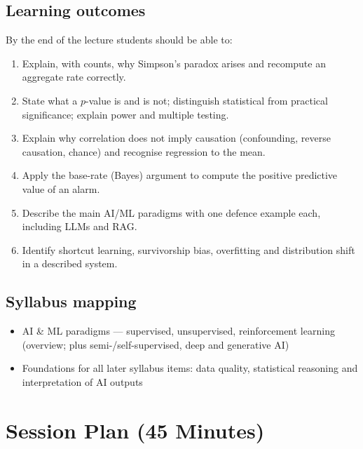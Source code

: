 \documentclass[11pt]{article}
\begin{document}
\subsection*{Learning outcomes}By the end of the lecture students should be able to:\begin{enumerate}\item Explain, with counts, why Simpson's paradox arises and recompute an aggregate rate correctly.\item State what a $p$-value is and is not; distinguish statistical from practical significance; explain power and multiple testing.\item Explain why correlation does not imply causation (confounding, reverse causation, chance) and recognise regression to the mean.\item Apply the base-rate (Bayes) argument to compute the positive predictive value of an alarm.\item Describe the main AI/ML paradigms with one defence example each, including LLMs and RAG.\item Identify shortcut learning, survivorship bias, overfitting and distribution shift in a described system.\end{enumerate}

\subsection*{Syllabus mapping}\begin{itemize}\item AI \& ML paradigms --- supervised, unsupervised, reinforcement learning (overview; plus semi-/self-supervised, deep and generative AI)\item Foundations for all later syllabus items: data quality, statistical reasoning and interpretation of AI outputs\end{itemize}

\section{Session Plan (45 Minutes)}
\end{document}
